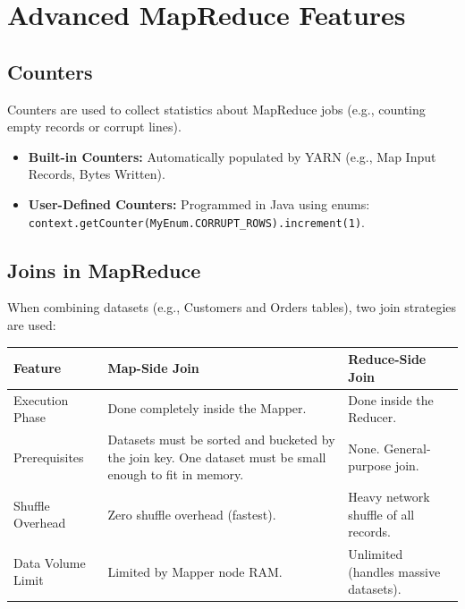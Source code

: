 \documentclass[12pt,a4paper]{article}
\renewcommand{\arraystretch}{1.45}
\begin{document}
\section{Advanced MapReduce Features}

\subsection{Counters}
Counters are used to collect statistics about MapReduce jobs (e.g., counting empty records or corrupt lines).
\begin{itemize}[leftmargin=*, itemsep=3pt]
  \item \textbf{Built-in Counters:} Automatically populated by YARN (e.g., Map Input Records, Bytes Written).
  \item \textbf{User-Defined Counters:} Programmed in Java using enums: \texttt{context.getCounter(MyEnum.CORRUPT\_ROWS).increment(1)}.
\end{itemize}

\subsection{Joins in MapReduce}
When combining datasets (e.g., Customers and Orders tables), two join strategies are used:

\par\vspace{6pt}\noindent
{\renewcommand{\arraystretch}{1.4}%
\begin{tabularx}{\linewidth}{|B{3.0cm}|Y|Y|}
\hline
\textbf{Feature} & \textbf{Map-Side Join} & \textbf{Reduce-Side Join} \\
\hline
Execution Phase & Done completely inside the Mapper. & Done inside the Reducer. \\
\hline
Prerequisites & Datasets must be sorted and bucketed by the join key. One dataset must be small enough to fit in memory. & None. General-purpose join. \\
\hline
Shuffle Overhead & Zero shuffle overhead (fastest). & Heavy network shuffle of all records. \\
\hline
Data Volume Limit & Limited by Mapper node RAM. & Unlimited (handles massive datasets). \\
\hline
\end{tabularx}}

\newpage
\end{document}

